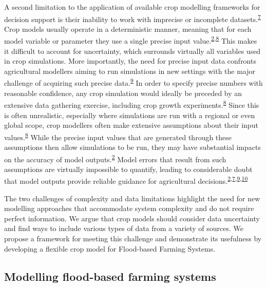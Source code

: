\documentclass[]{elsarticle} %
\begin{document}
A second limitation to the application of available crop modelling frameworks for decision support is their inability to work with imprecise or incomplete datasets.\textsuperscript{\protect\hyperlink{ref-Luedeling_and_Shepherd_2016b}{7}} Crop models usually operate in a deterministic manner, meaning that for each model variable or parameter they use a single precise input value.\textsuperscript{\protect\hyperlink{ref-Uusitalo_et_al_2015}{2},\protect\hyperlink{ref-Baroni_and_Tarantola_2014}{8}} This makes it difficult to account for uncertainty, which surrounds virtually all variables used in crop simulations. More importantly, the need for precise input data confronts agricultural modellers aiming to run simulations in new settings with the major challenge of acquiring such precise data.\textsuperscript{\protect\hyperlink{ref-Luedeling_et_al_2015}{9}} In order to specify precise numbers with reasonable confidence, any crop simulation would ideally be preceded by an extensive data gathering exercise, including crop growth experiments.\textsuperscript{\protect\hyperlink{ref-Baroni_and_Tarantola_2014}{8}} Since this is often unrealistic, especially where simulations are run with a regional or even global scope, crop modellers often make extensive assumptions about their input values.\textsuperscript{\protect\hyperlink{ref-Baroni_and_Tarantola_2014}{8}} While the precise input values that are generated through these assumptions then allow simulations to be run, they may have substantial impacts on the accuracy of model outputs.\textsuperscript{\protect\hyperlink{ref-Uusitalo_et_al_2015}{2}} Model errors that result from such assumptions are virtually impossible to quantify, leading to considerable doubt that model outputs provide reliable guidance for agricultural decisions.\textsuperscript{\protect\hyperlink{ref-Uusitalo_et_al_2015}{2},\protect\hyperlink{ref-Luedeling_and_Shepherd_2016b}{7},\protect\hyperlink{ref-Luedeling_et_al_2015}{9},\protect\hyperlink{ref-Yet_et_al_2016}{10}}

The two challenges of complexity and data limitations highlight the need for new modelling approaches that accommodate system complexity and do not require perfect information. We argue that crop models should consider data uncertainty and find ways to include various types of data from a variety of sources. We propose a framework for meeting this challenge and demonstrate its usefulness by developing a flexible crop model for Flood-based Farming Systems.

\hypertarget{modelling-flood-based-farming-systems}{%
\subsection*{Modelling flood-based farming systems}\label{modelling-flood-based-farming-systems}}
\end{document}

